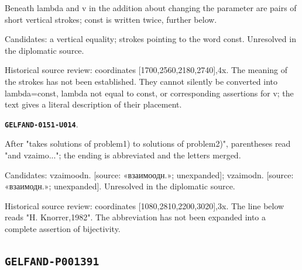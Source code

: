 \documentclass[11pt]{article}
\theoremstyle{definition}
\theoremstyle{remark}
\begin{document}
Beneath lambda and v in the addition about changing the parameter are pairs of short vertical strokes; const is written twice, further below.\par
Candidates: a vertical equality; strokes pointing to the word const. Unresolved in the diplomatic source.\par
Historical source review: coordinates [1700,2560,2180,2740],4x. The meaning of the strokes has not been established. They cannot silently be converted into lambda=const, lambda not equal to const, or corresponding assertions for v; the text gives a literal description of their placement.\par\medskip
\par\noindent\leavevmode{}\label{GELFAND-0151-U014}\label{GELFAND-P001390:bijection-note:note}\textbf{\texttt{GELFAND-0151-U014}}.\nopagebreak[4]\par
After "takes solutions of problem1) to solutions of problem2)", parentheses read "and vzaimo..."; the ending is abbreviated and the letters merged.\par
Candidates: vzaimoodn. [source: «взаимоодн.»; unexpanded]; vzaimodn. [source: «взаимодн.»; unexpanded]. Unresolved in the diplomatic source.\par
Historical source review: coordinates [1080,2810,2200,3020],3x. The line below reads "H. Knorrer,1982". The abbreviation has not been expanded into a complete assertion of bijectivity.\par\medskip
\subsection*{\texttt{GELFAND-P001391}}
\end{document}
